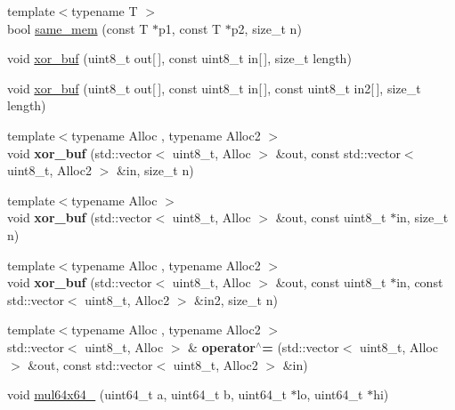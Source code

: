 \begin{DoxyCompactItemize}
\item 
{\footnotesize template$<$typename T $>$ }\\bool \mbox{\hyperlink{namespace_botan_abaf9f9ec7cd1cb34fa0a9b98592fcb84}{same\+\_\+mem}} (const T $\ast$p1, const T $\ast$p2, size\+\_\+t n)
\item 
void \mbox{\hyperlink{namespace_botan_a9c8197d5fc973d59ae216ca5f865be55}{xor\+\_\+buf}} (uint8\+\_\+t out\mbox{[}$\,$\mbox{]}, const uint8\+\_\+t in\mbox{[}$\,$\mbox{]}, size\+\_\+t length)
\item 
void \mbox{\hyperlink{namespace_botan_a47f27789ca2bd6074362a06f2ee5bea4}{xor\+\_\+buf}} (uint8\+\_\+t out\mbox{[}$\,$\mbox{]}, const uint8\+\_\+t in\mbox{[}$\,$\mbox{]}, const uint8\+\_\+t in2\mbox{[}$\,$\mbox{]}, size\+\_\+t length)
\item 
\mbox{\label{namespace_botan_ad250255def82fb51f03f1ffd85dcf494}} 
{\footnotesize template$<$typename Alloc , typename Alloc2 $>$ }\\void {\bfseries xor\+\_\+buf} (std\+::vector$<$ uint8\+\_\+t, Alloc $>$ \&out, const std\+::vector$<$ uint8\+\_\+t, Alloc2 $>$ \&in, size\+\_\+t n)
\item 
\mbox{\label{namespace_botan_a18642b9fd664c941c69a454f3cfab55d}} 
{\footnotesize template$<$typename Alloc $>$ }\\void {\bfseries xor\+\_\+buf} (std\+::vector$<$ uint8\+\_\+t, Alloc $>$ \&out, const uint8\+\_\+t $\ast$in, size\+\_\+t n)
\item 
\mbox{\label{namespace_botan_a4bd935f4fd84f069c075d98ca62c02df}} 
{\footnotesize template$<$typename Alloc , typename Alloc2 $>$ }\\void {\bfseries xor\+\_\+buf} (std\+::vector$<$ uint8\+\_\+t, Alloc $>$ \&out, const uint8\+\_\+t $\ast$in, const std\+::vector$<$ uint8\+\_\+t, Alloc2 $>$ \&in2, size\+\_\+t n)
\item 
\mbox{\label{namespace_botan_afe264cb81bc30a2cd69ee3db85bf8abc}} 
{\footnotesize template$<$typename Alloc , typename Alloc2 $>$ }\\std\+::vector$<$ uint8\+\_\+t, Alloc $>$ \& {\bfseries operator$^\wedge$=} (std\+::vector$<$ uint8\+\_\+t, Alloc $>$ \&out, const std\+::vector$<$ uint8\+\_\+t, Alloc2 $>$ \&in)
\item 
void \mbox{\hyperlink{namespace_botan_ad0da4682632518b5b7b11848dc3025e3}{mul64x64\+\_}} (uint64\+\_\+t a, uint64\+\_\+t b, uint64\+\_\+t $\ast$lo, uint64\+\_\+t $\ast$hi)

\end{DoxyCompactItemize}
